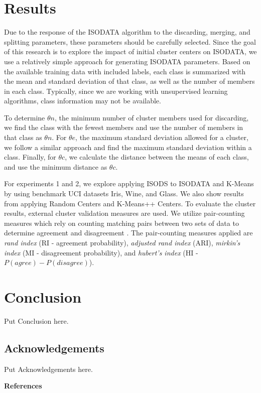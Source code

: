 \documentclass[a4paper,10pt]{article}
\begin{document}

\section{Results}

Due to the response of the ISODATA algorithm to the discarding, merging, and
splitting parameters, these parameters should be carefully selected. Since the
goal of this research is to explore the impact of initial cluster centers on
ISODATA, we use a relatively simple approach for generating ISODATA parameters.
Based on the available training data with included labels, each class is
summarized with the mean and standard deviation of that class, as well as the
number of members in each class. Typically, since we are working with
unsupervised learning algorithms, class information may not be available.

To determine $\theta n$, the minimum number of cluster members used for
discarding, we find the class with the fewest members and use the number of
members in that class as $\theta n$. For $\theta e$, the maximum standard
deviation allowed for a cluster, we follow a similar approach and find the
maximum standard deviation within a class. Finally, for $\theta c$, we calculate
the distance between the means of each class, and use the minimum distance as
$\theta c$.

For experiments 1 and 2, we explore applying ISODS to ISODATA and K-Means by
using benchmark UCI datasets Iris, Wine, and Glass. We also show results from
applying Random Centers and K-Means++ Centers. To evaluate the cluster results,
external cluster validation measures are used. We utilize pair-counting measures
which rely on counting matching pairs between two sets of data to determine
agreement and disagreement \cite{Rezaei2016}. The pair-counting measures applied
are \textit{rand index} (RI - agreement probability), \textit{adjusted rand
      index} (ARI), \textit{mirkin's index} (MI - disagreement probability), and
\textit{hubert's index} (HI - $P(agree) - P(disagree)$)\cite{Hubert1985,
      Meila2003}.


\section{Conclusion}
Put Conclusion here.


\subsection*{Acknowledgements}
Put Acknowledgements here.

\vspace{5mm}

\begin{center}
      {\large \bf References}
\end{center}



\end{document}

